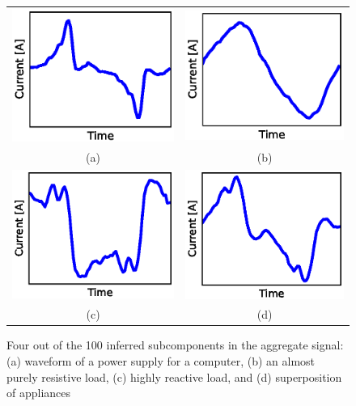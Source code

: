 \begin{figure}[!ht]
\begin{tabular}{cc}
  \includegraphics[width=0.45\linewidth]{bolt/comp_all18.eps} &   \includegraphics[width=0.45\linewidth]{bolt/comp_all78.eps} \\
(a) & (b) \\
 \includegraphics[width=0.45\linewidth]{bolt/comp_all1.eps} &   \includegraphics[width=0.45\linewidth]{bolt/comp_all26.eps} \\
(c)  & (d) \\
\end{tabular}
\caption[BOLT: Example inferred subcomponents extracted with BOLT.]{Four out of the 100 inferred subcomponents in the aggregate signal: (a) waveform of a power supply for a computer, (b) an almost purely resistive load, (c) highly reactive load, and (d) superposition of appliances}
\label{fg:wv}
\end{figure}

